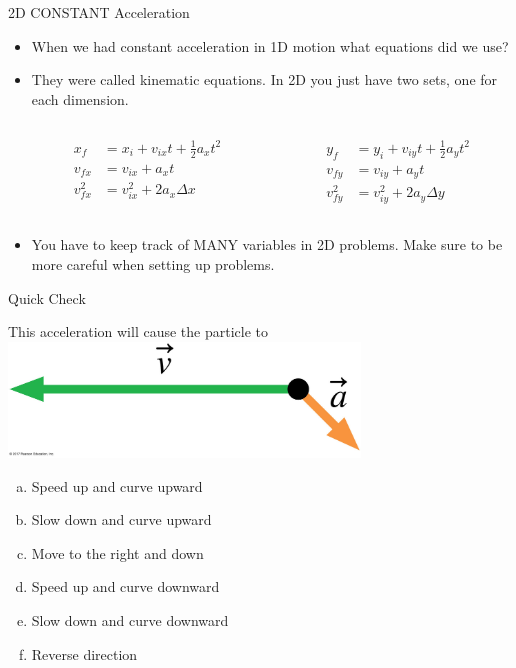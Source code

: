 \documentclass{beamer}
\newcommand{\red}[1]{{\color{red}{#1}}}
\newcommand{\checkl}[2]{\begin{textblock*}{1cm}(#1,#2){\large \red{\Checkmark}}\end{textblock*}}
\begin{document}
\begin{frame}{2D CONSTANT Acceleration}
\begin{itemize}
   \item When we had constant acceleration in 1D motion what equations did we use?
   \item<2-> They were called kinematic equations. In 2D you just have two sets, one for each dimension.
   \begin{columns}
   \begin{column}{0.5\textwidth}
   \begin{align*}
      x_f &= x_i + v_{ix}t + \frac{1}{2}a_xt^2 \\
      v_{fx} &= v_{ix} + a_xt \\
      v_{fx}^2 &= v_{ix}^2 + 2a_x\Delta x
   \end{align*}
   \end{column}
   \begin{column}{0.5\textwidth}
   \begin{align*}
      y_f &= y_i + v_{iy}t + \frac{1}{2}a_yt^2 \\
      v_{fy} &= v_{iy} + a_yt \\
      v_{fy}^2 &= v_{iy}^2 + 2a_y\Delta y
   \end{align*}
   \end{column}
   \end{columns}
   \item<3-> You have to keep track of MANY variables in 2D problems. Make sure to be more careful when setting up problems.
\end{itemize}
\end{frame}

\begin{frame}{Quick Check}
\begin{center}
   This acceleration will cause the particle to
   \includegraphics[width=0.7\textwidth]{../figures/Figure_STT4_2.jpg}
   \begin{enumerate}[a.]
      \item Speed up and curve upward
      \item Slow down and curve upward
      \item Move to the right and down
      \item Speed up and curve downward
      \item Slow down and curve downward
      \item Reverse direction
   \end{enumerate}
\end{center}
\only<2>{\checkl{0.6cm}{7.1cm}}
\end{frame}
\end{document}
